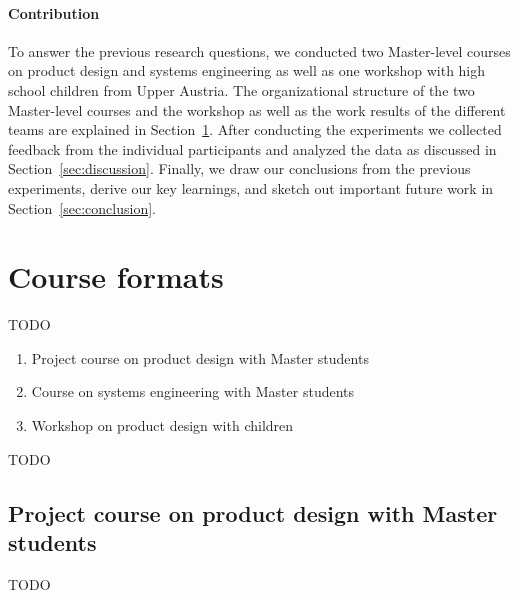 \documentclass{PDS}
\begin{document}
\paragraph{Contribution}

To answer the previous research questions, we conducted two Master-level courses on product design and systems engineering as well as one workshop with high school children from Upper Austria.
The organizational structure of the two Master-level courses and the workshop as well as the work results of the different teams are explained in Section~\ref{sec:contribution}.
After conducting the experiments we collected feedback from the individual participants and analyzed the data as discussed in Section~\ref{sec:discussion}.
Finally, we draw our conclusions from the previous experiments, derive our key learnings, and sketch out important future work in Section~\ref{sec:conclusion}.

\section{Course formats}
\label{sec:contribution}

TODO

\begin{enumerate}
    \item Project course on product design with Master students
    \item Course on systems engineering with Master students
    \item Workshop on product design with children
\end{enumerate}

TODO

\subsection{Project course on product design with Master students}

TODO
\end{document}
